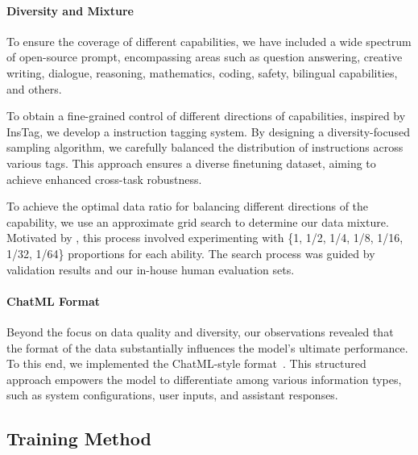 
\paragraph{Diversity and Mixture}
To ensure the coverage of different capabilities, we have included a wide spectrum of open-source prompt,
encompassing areas such as question answering, creative writing, dialogue, reasoning, mathematics, coding, safety, bilingual capabilities, and others. 

To obtain a fine-grained control of different directions of capabilities, inspired by InsTag\citep{lu2023instag}, we develop a instruction tagging system. By designing a diversity-focused sampling algorithm, we carefully balanced the distribution of instructions across various tags. This approach ensures a diverse finetuning dataset, aiming to achieve enhanced cross-task robustness.

To achieve the optimal data ratio for balancing different directions of the capability, we use an approximate grid search to determine our data mixture. Motivated by \citet{dong2023abilities}, this process involved experimenting with \{1, 1/2, 1/4, 1/8, 1/16, 1/32, 1/64\} proportions for each ability. The search process was guided by validation results 
and our in-house human evaluation sets.

\paragraph{ChatML Format} Beyond the focus on data quality and diversity, our observations revealed that the format of the data substantially influences the model's ultimate performance. To this end, we implemented the ChatML-style format~\citep{chatml}. This structured approach empowers the model to differentiate among various information types, such as system configurations, user inputs, and assistant responses.

\subsection{Training Method}

